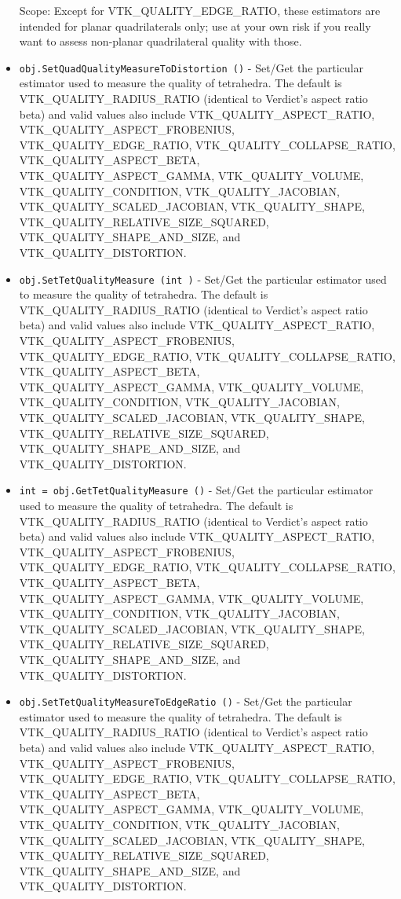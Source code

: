 \begin{itemize}
 Scope: Except for VTK\_QUALITY\_EDGE\_RATIO, these estimators are intended for planar
 quadrilaterals only; use at your own risk if you really want to assess non-planar
 quadrilateral quality with those.

\item  \verb|obj.SetQuadQualityMeasureToDistortion ()| -  Set/Get the particular estimator used to measure the quality of tetrahedra.
 The default is VTK\_QUALITY\_RADIUS\_RATIO (identical to Verdict's aspect
 ratio beta) and valid values also include
 VTK\_QUALITY\_ASPECT\_RATIO, VTK\_QUALITY\_ASPECT\_FROBENIUS, VTK\_QUALITY\_EDGE\_RATIO,
 VTK\_QUALITY\_COLLAPSE\_RATIO, VTK\_QUALITY\_ASPECT\_BETA, VTK\_QUALITY\_ASPECT\_GAMMA, 
 VTK\_QUALITY\_VOLUME, VTK\_QUALITY\_CONDITION, VTK\_QUALITY\_JACOBIAN, 
 VTK\_QUALITY\_SCALED\_JACOBIAN, VTK\_QUALITY\_SHAPE, VTK\_QUALITY\_RELATIVE\_SIZE\_SQUARED,
 VTK\_QUALITY\_SHAPE\_AND\_SIZE, and VTK\_QUALITY\_DISTORTION.

\item  \verb|obj.SetTetQualityMeasure (int )| -  Set/Get the particular estimator used to measure the quality of tetrahedra.
 The default is VTK\_QUALITY\_RADIUS\_RATIO (identical to Verdict's aspect
 ratio beta) and valid values also include
 VTK\_QUALITY\_ASPECT\_RATIO, VTK\_QUALITY\_ASPECT\_FROBENIUS, VTK\_QUALITY\_EDGE\_RATIO,
 VTK\_QUALITY\_COLLAPSE\_RATIO, VTK\_QUALITY\_ASPECT\_BETA, VTK\_QUALITY\_ASPECT\_GAMMA, 
 VTK\_QUALITY\_VOLUME, VTK\_QUALITY\_CONDITION, VTK\_QUALITY\_JACOBIAN, 
 VTK\_QUALITY\_SCALED\_JACOBIAN, VTK\_QUALITY\_SHAPE, VTK\_QUALITY\_RELATIVE\_SIZE\_SQUARED,
 VTK\_QUALITY\_SHAPE\_AND\_SIZE, and VTK\_QUALITY\_DISTORTION.

\item  \verb|int = obj.GetTetQualityMeasure ()| -  Set/Get the particular estimator used to measure the quality of tetrahedra.
 The default is VTK\_QUALITY\_RADIUS\_RATIO (identical to Verdict's aspect
 ratio beta) and valid values also include
 VTK\_QUALITY\_ASPECT\_RATIO, VTK\_QUALITY\_ASPECT\_FROBENIUS, VTK\_QUALITY\_EDGE\_RATIO,
 VTK\_QUALITY\_COLLAPSE\_RATIO, VTK\_QUALITY\_ASPECT\_BETA, VTK\_QUALITY\_ASPECT\_GAMMA, 
 VTK\_QUALITY\_VOLUME, VTK\_QUALITY\_CONDITION, VTK\_QUALITY\_JACOBIAN, 
 VTK\_QUALITY\_SCALED\_JACOBIAN, VTK\_QUALITY\_SHAPE, VTK\_QUALITY\_RELATIVE\_SIZE\_SQUARED,
 VTK\_QUALITY\_SHAPE\_AND\_SIZE, and VTK\_QUALITY\_DISTORTION.

\item  \verb|obj.SetTetQualityMeasureToEdgeRatio ()| -  Set/Get the particular estimator used to measure the quality of tetrahedra.
 The default is VTK\_QUALITY\_RADIUS\_RATIO (identical to Verdict's aspect
 ratio beta) and valid values also include
 VTK\_QUALITY\_ASPECT\_RATIO, VTK\_QUALITY\_ASPECT\_FROBENIUS, VTK\_QUALITY\_EDGE\_RATIO,
 VTK\_QUALITY\_COLLAPSE\_RATIO, VTK\_QUALITY\_ASPECT\_BETA, VTK\_QUALITY\_ASPECT\_GAMMA, 
 VTK\_QUALITY\_VOLUME, VTK\_QUALITY\_CONDITION, VTK\_QUALITY\_JACOBIAN, 
 VTK\_QUALITY\_SCALED\_JACOBIAN, VTK\_QUALITY\_SHAPE, VTK\_QUALITY\_RELATIVE\_SIZE\_SQUARED,
 VTK\_QUALITY\_SHAPE\_AND\_SIZE, and VTK\_QUALITY\_DISTORTION.


\end{itemize}
